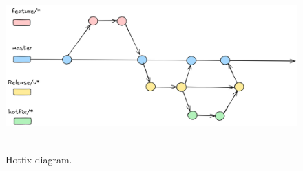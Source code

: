 ﻿\begin{figure}[H]
    \centering
    \includegraphics[width=1\textwidth]{img/HotFix_Strategy}
    ~\caption{Hotfix diagram.}\label{fig:hotfix-diagram}
\end{figure}
